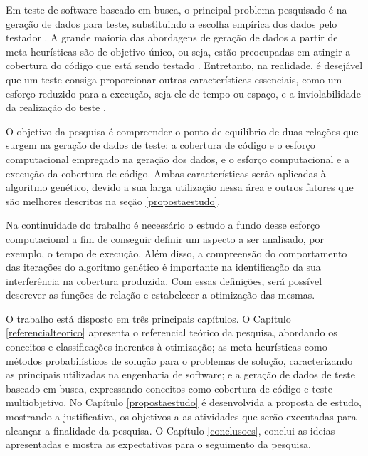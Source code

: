 Em teste de software baseado em busca, o principal problema pesquisado é na geração de dados para teste, substituindo a escolha empírica dos dados pelo testador \cite{mcminn2004search}. A grande maioria das abordagens de geração de dados a partir de meta-heurísticas são de objetivo único, ou seja, estão preocupadas em atingir a cobertura do código que está sendo testado \cite{harman2015achievements}. Entretanto, na realidade, é desejável que um teste consiga proporcionar outras características essenciais, como um esforço reduzido para a execução, seja ele de tempo ou espaço, e a inviolabilidade da realização do teste \cite{harman2015achievements}.

O objetivo da pesquisa é compreender o ponto de equilíbrio de duas relações que surgem na geração de dados de teste: a cobertura de código e o esforço computacional empregado na geração dos dados, e o esforço computacional e a execução da cobertura de código. Ambas características serão aplicadas à algoritmo genético, devido a sua larga utilização nessa área e outros fatores que são melhores descritos na seção \ref{propostaestudo}.

Na continuidade do trabalho é necessário o estudo a fundo desse esforço computacional a fim de conseguir definir um aspecto a ser analisado, por exemplo, o tempo de execução. Além disso, a compreensão do comportamento das iterações do algoritmo genético é importante na identificação da sua interferência na cobertura produzida. Com essas definições, será possível descrever as funções de relação e estabelecer a otimização das mesmas. 

O trabalho está disposto em três principais capítulos. O Capítulo \ref{referencialteorico} apresenta o referencial teórico da pesquisa, abordando os conceitos e classificações inerentes à otimização; as meta-heurísticas como métodos probabilísticos de solução para o problemas de solução, caracterizando as principais utilizadas na engenharia de software; e a geração de dados de teste baseado em busca, expressando conceitos como cobertura de código e teste multiobjetivo. No Capítulo \ref{propostaestudo} é desenvolvida a proposta de estudo, mostrando a justificativa, os objetivos a as atividades que serão executadas para alcançar a finalidade da pesquisa. O Capítulo \ref{conclusoes}, conclui as ideias apresentadas e mostra as expectativas para o seguimento da pesquisa.

 




